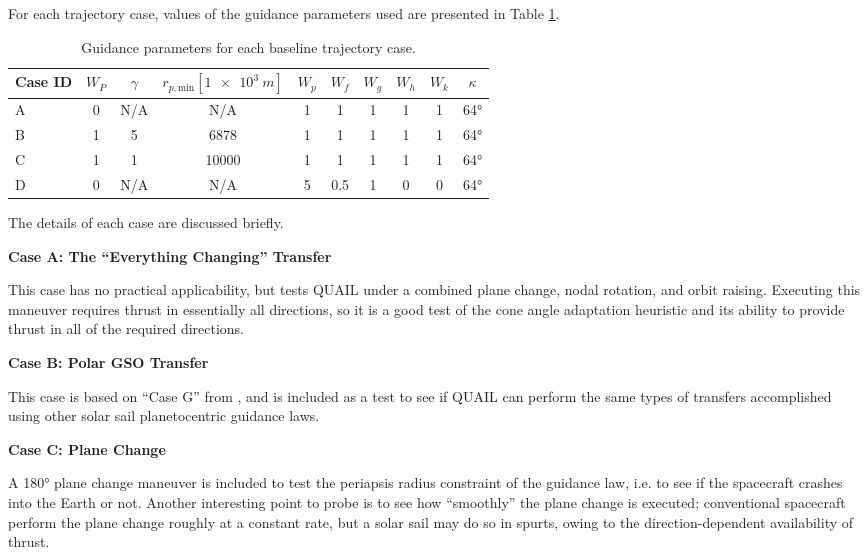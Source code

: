 For each trajectory case, values of the guidance parameters used are presented in Table \ref{tab:trajectory_case_params}.
\begin{table}[H]
  \centering
  \begin{tabular}{lccccccccc}
    \toprule
    \textbf{Case ID} & \(W_P\) & \(\gamma\) & \(r_{p, \text{min}} [\qty{1e3}{m}]\) & \(W_p\) & \(W_f\) & \(W_g\) & \(W_h\) & \(W_k\) & \(\kappa\) \\
    \midrule
    A                & 0       & N/A        & N/A                                  & 1       & 1       & 1       & 1       & 1       & \ang{64}   \\
    B                & 1       & 5          & 6878                                 & 1       & 1       & 1       & 1       & 1       & \ang{64}   \\
    C                & 1       & 1          & 10000                                & 1       & 1       & 1       & 1       & 1       & \ang{64}   \\
    D                & 0       & N/A        & N/A                                  & 5       & 0.5     & 1       & 0       & 0       & \ang{64}   \\
    \bottomrule
  \end{tabular}
  \caption{Guidance parameters for each baseline trajectory case.}
  \label{tab:trajectory_case_params}
\end{table}

The details of each case are discussed briefly.

\textbf{Case A: The ``Everything Changing'' Transfer}

This case has no practical applicability, but tests QUAIL under a combined plane change, nodal rotation, and orbit raising. Executing this maneuver requires thrust in essentially all directions, so it is a good test of the cone angle adaptation heuristic and its ability to provide thrust in all of the required directions.

\textbf{Case B: Polar GSO Transfer}

This case is based on ``Case G'' from \cite{oguri2023solar}, and is included as a test to see if QUAIL can perform the same types of transfers accomplished using other solar sail planetocentric guidance laws.

\textbf{Case C: Plane Change}

A \ang{180} plane change maneuver is included to test the periapsis radius constraint of the guidance law, i.e. to see if the spacecraft crashes into the Earth or not. Another interesting point to probe is to see how ``smoothly'' the plane change is executed; conventional spacecraft perform the plane change roughly at a constant rate, but a solar sail may do so in spurts, owing to the direction-dependent availability of thrust.


